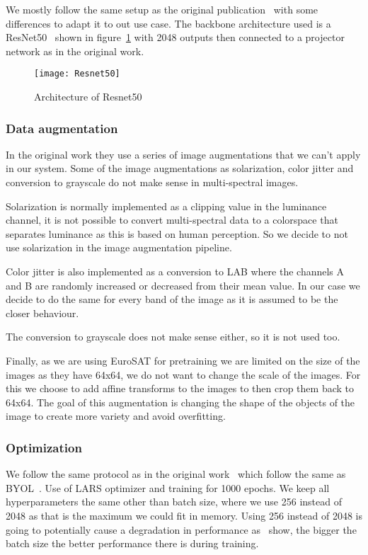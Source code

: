 \documentclass[conference]{IEEEtran}
\begin{document}
    We mostly follow the same setup as the original publication~\cite{barlowtwins} with some differences to adapt it to out use case.
    The backbone architecture used is a ResNet50~\cite{he2015deep} shown in figure~\ref{fig:resnet50} with 2048 outputs then connected to a projector network as in the original work.

    \begin{figure}
        \centering
        \texttt{[image: Resnet50]}
        \caption{Architecture of Resnet50}
        \label{fig:resnet50}
    \end{figure}

    \subsubsection{Data augmentation}
    In the original work they use a series of image augmentations that we can't apply in our system.
    Some of the image augmentations as solarization, color jitter and conversion to grayscale do not make sense in multi-spectral images.

    Solarization is normally implemented as a clipping value in the luminance channel, it is not possible to convert multi-spectral data to
    a colorspace that separates luminance as this is based on human perception.
    So we decide to not use solarization in the image augmentation pipeline.

    Color jitter is also implemented as a conversion to LAB where the channels A and B are randomly increased or decreased from their mean value.
    In our case we decide to do the same for every band of the image as it is assumed to be the closer behaviour.

    The conversion to grayscale does not make sense either, so it is not used too.

    Finally, as we are using EuroSAT for pretraining we are limited on the size of the images as they have 64x64, we do not want to change the scale of the images.
    For this we choose to add affine transforms to the images to then crop them back to 64x64.
    The goal of this augmentation is changing the shape of the objects of the image to create more variety and avoid overfitting.

    \subsubsection{Optimization}
    We follow the same protocol as in the original work~\cite{barlowtwins} which follow the same as BYOL~\cite{grill2020bootstrap}.
    Use of LARS optimizer and training for 1000 epochs.
    We keep all hyperparameters the same other than batch size, where we use 256 instead of 2048 as that is the maximum we could fit in memory.
    Using 256 instead of 2048 is going to potentially cause a degradation in performance as~\citet{grill2020bootstrap, chen2020simple, barlowtwins}
    show, the bigger the batch size the better performance there is during training.
\end{document}

